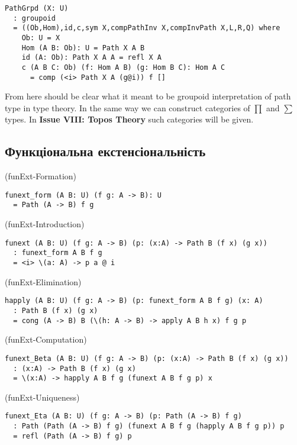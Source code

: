 \begin{lstlisting}
PathGrpd (X: U)
  : groupoid
  = ((Ob,Hom),id,c,sym X,compPathInv X,compInvPath X,L,R,Q) where
    Ob: U = X
    Hom (A B: Ob): U = Path X A B
    id (A: Ob): Path X A A = refl X A
    c (A B C: Ob) (f: Hom A B) (g: Hom B C): Hom A C
      = comp (<i> Path X A (g@i)) f []
\end{lstlisting}
From here should be clear what it meant to be groupoid interpretation
of path type in type theory. In the same way we can construct categories of $\prod$ and $\sum$ types.
In {\bf Issue VIII: Topos Theory} such categories will be given.

\subsection{Функціональна екстенсіональність}

\begin{definition} (funExt-Formation)
\begin{lstlisting}
funext_form (A B: U) (f g: A -> B): U
  = Path (A -> B) f g
\end{lstlisting}
\end{definition}

\begin{definition} (funExt-Introduction)
\begin{lstlisting}
funext (A B: U) (f g: A -> B) (p: (x:A) -> Path B (f x) (g x))
  : funext_form A B f g
  = <i> \(a: A) -> p a @ i
\end{lstlisting}
\end{definition}

\begin{definition} (funExt-Elimination)
\begin{lstlisting}
happly (A B: U) (f g: A -> B) (p: funext_form A B f g) (x: A)
  : Path B (f x) (g x)
  = cong (A -> B) B (\(h: A -> B) -> apply A B h x) f g p
\end{lstlisting}
\end{definition}

\begin{definition} (funExt-Computation)
\begin{lstlisting}
funext_Beta (A B: U) (f g: A -> B) (p: (x:A) -> Path B (f x) (g x))
  : (x:A) -> Path B (f x) (g x)
  = \(x:A) -> happly A B f g (funext A B f g p) x
\end{lstlisting}
\end{definition}

\begin{definition} (funExt-Uniqueness)
\begin{lstlisting}
funext_Eta (A B: U) (f g: A -> B) (p: Path (A -> B) f g)
  : Path (Path (A -> B) f g) (funext A B f g (happly A B f g p)) p
  = refl (Path (A -> B) f g) p
\end{lstlisting}
\end{definition}

